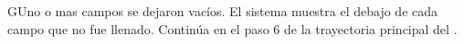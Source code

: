 

\begin{UCtrayectoriaA}{G}{Uno o mas campos se dejaron vacíos.}
	\UCpaso El sistema muestra el  debajo de cada campo que no fue llenado. 
	\UCpaso	Continúa en el paso 6 de la trayectoria principal del .
\end{UCtrayectoriaA}

